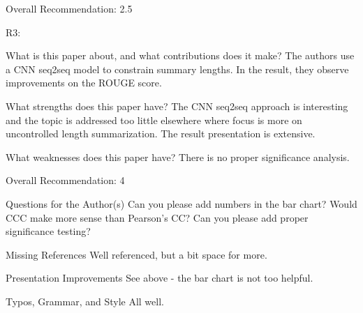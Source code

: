 Overall Recommendation:	2.5

R3:

What is this paper about, and what contributions does it make?
   The authors use a CNN seq2seq model to constrain summary lengths. In the result, they observe improvements on the ROUGE score.

What strengths does this paper have?
   The CNN seq2seq approach is interesting and the topic is addressed too little elsewhere where focus is more on uncontrolled length summarization. The result presentation is extensive.

What weaknesses does this paper have?
  There is no proper significance analysis.

Overall Recommendation:	4

Questions for the Author(s)
   Can you please add numbers in the bar chart? Would CCC make more sense than Pearson's CC? Can you please add proper significance testing?

Missing References
   Well referenced, but a bit space for more.

Presentation Improvements
  See above - the bar chart is not too helpful.

Typos, Grammar, and Style
  All well.

